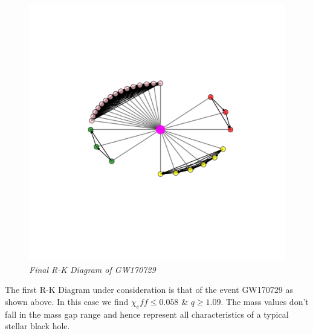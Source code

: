     \begin{figure}[H]
        \centering
        \includegraphics[width=1.0\linewidth]{images/GW170729_RK_Diagram.png}
        \caption{\textit{Final R-K Diagram of GW170729}}
        \label{fig:LIGO14_PlaceHolder1_fig}
    \end{figure}

The first R-K Diagram under consideration is that of the event GW170729 as shown above. In this case we find $\chi_eff \le 0.058$ \&  $q\ge 1.09$. The mass values don't fall in the mass gap range and hence represent all characteristics of a typical stellar black hole.

